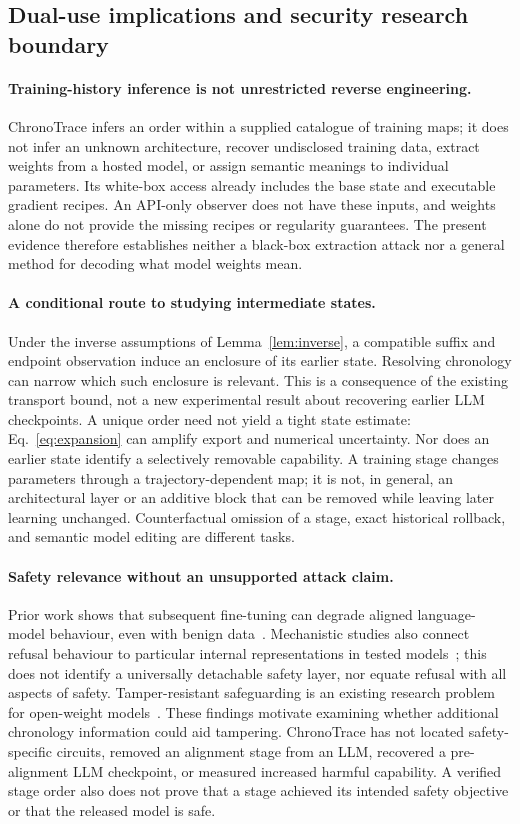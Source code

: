 \subsection{Dual-use implications and security research boundary}\label{sec:dualuse}
\paragraph{Training-history inference is not unrestricted reverse engineering.}
ChronoTrace infers an order within a supplied catalogue of training maps; it does not infer an unknown architecture, recover undisclosed training data, extract weights from a hosted model, or assign semantic meanings to individual parameters. Its white-box access already includes the base state and executable gradient recipes. An API-only observer does not have these inputs, and weights alone do not provide the missing recipes or regularity guarantees. The present evidence therefore establishes neither a black-box extraction attack nor a general method for decoding what model weights mean.

\paragraph{A conditional route to studying intermediate states.}
Under the inverse assumptions of Lemma~\ref{lem:inverse}, a compatible suffix and endpoint observation induce an enclosure of its earlier state. Resolving chronology can narrow which such enclosure is relevant. This is a consequence of the existing transport bound, not a new experimental result about recovering earlier LLM checkpoints. A unique order need not yield a tight state estimate: Eq.~\eqref{eq:expansion} can amplify export and numerical uncertainty. Nor does an earlier state identify a selectively removable capability. A training stage changes parameters through a trajectory-dependent map; it is not, in general, an architectural layer or an additive block that can be removed while leaving later learning unchanged. Counterfactual omission of a stage, exact historical rollback, and semantic model editing are different tasks.

\paragraph{Safety relevance without an unsupported attack claim.}
Prior work shows that subsequent fine-tuning can degrade aligned language-model behaviour, even with benign data~\cite{qi2023safety}. Mechanistic studies also connect refusal behaviour to particular internal representations in tested models~\cite{arditi2024refusal}; this does not identify a universally detachable safety layer, nor equate refusal with all aspects of safety. Tamper-resistant safeguarding is an existing research problem for open-weight models~\cite{tamirisa2024tamper}. These findings motivate examining whether additional chronology information could aid tampering. ChronoTrace has not located safety-specific circuits, removed an alignment stage from an LLM, recovered a pre-alignment LLM checkpoint, or measured increased harmful capability. A verified stage order also does not prove that a stage achieved its intended safety objective or that the released model is safe.

